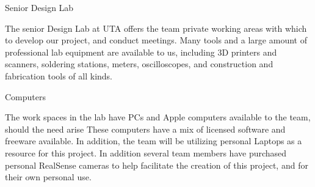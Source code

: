 
{Senior Design Lab}

The senior Design Lab at UTA offers the team private working areas with which to develop our project, and conduct meetings. Many tools and a large amount of professional lab equipment are available to us, including 3D printers and scanners, soldering stations, meters, oscilloscopes, and construction and fabrication tools of all kinds.   


{Computers}

The work spaces in the lab have PCs and Apple computers available to the team, should the need arise  These computers have a mix of licensed software and freeware available. In addition, the team will be utilizing personal Laptops as a resource for this project. In addition several team members have purchased personal RealSense cameras to help facilitate the creation of this project, and for their own personal use.  
 
